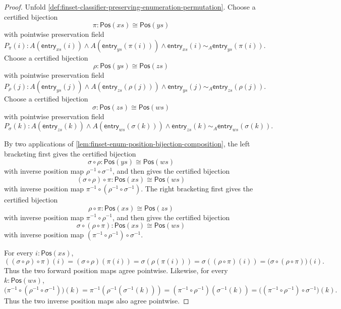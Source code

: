 \begin{proof}
Unfold \autoref{def:finset-classifier-preserving-enumeration-permutation}. Choose a certified bijection
$$
\pi:\mathsf{Pos}(xs)\cong\mathsf{Pos}(ys)
$$
with pointwise preservation field
$$
P_\pi(i):
A(\mathsf{entry}_{xs}(i))\land
A(\mathsf{entry}_{ys}(\pi(i)))\land
\mathsf{entry}_{xs}(i)\sim_A\mathsf{entry}_{ys}(\pi(i)).
$$
Choose a certified bijection
$$
\rho:\mathsf{Pos}(ys)\cong\mathsf{Pos}(zs)
$$
with pointwise preservation field
$$
P_\rho(j):
A(\mathsf{entry}_{ys}(j))\land
A(\mathsf{entry}_{zs}(\rho(j)))\land
\mathsf{entry}_{ys}(j)\sim_A\mathsf{entry}_{zs}(\rho(j)).
$$
Choose a certified bijection
$$
\sigma:\mathsf{Pos}(zs)\cong\mathsf{Pos}(ws)
$$
with pointwise preservation field
$$
P_\sigma(k):
A(\mathsf{entry}_{zs}(k))\land
A(\mathsf{entry}_{ws}(\sigma(k)))\land
\mathsf{entry}_{zs}(k)\sim_A\mathsf{entry}_{ws}(\sigma(k)).
$$

By two applications of \autoref{lem:finset-enum-position-bijection-composition}, the left bracketing first gives the certified bijection
$$
\sigma\circ\rho:\mathsf{Pos}(ys)\cong\mathsf{Pos}(ws)
$$
with inverse position map $\rho^{-1}\circ\sigma^{-1}$, and then gives the certified bijection
$$
(\sigma\circ\rho)\circ\pi:\mathsf{Pos}(xs)\cong\mathsf{Pos}(ws)
$$
with inverse position map $\pi^{-1}\circ(\rho^{-1}\circ\sigma^{-1})$. The right bracketing first gives the certified bijection
$$
\rho\circ\pi:\mathsf{Pos}(xs)\cong\mathsf{Pos}(zs)
$$
with inverse position map $\pi^{-1}\circ\rho^{-1}$, and then gives the certified bijection
$$
\sigma\circ(\rho\circ\pi):\mathsf{Pos}(xs)\cong\mathsf{Pos}(ws)
$$
with inverse position map $(\pi^{-1}\circ\rho^{-1})\circ\sigma^{-1}$.

For every $i:\mathsf{Pos}(xs)$,
$$
((\sigma\circ\rho)\circ\pi)(i)
=(\sigma\circ\rho)(\pi(i))
=\sigma(\rho(\pi(i)))
=\sigma((\rho\circ\pi)(i))
=\bigl(\sigma\circ(\rho\circ\pi)\bigr)(i).
$$
Thus the two forward position maps agree pointwise. Likewise, for every $k:\mathsf{Pos}(ws)$,
$$
\bigl(\pi^{-1}\circ(\rho^{-1}\circ\sigma^{-1})\bigr)(k)
=\pi^{-1}(\rho^{-1}(\sigma^{-1}(k)))
=(\pi^{-1}\circ\rho^{-1})(\sigma^{-1}(k))
=\bigl((\pi^{-1}\circ\rho^{-1})\circ\sigma^{-1}\bigr)(k).
$$
Thus the two inverse position maps also agree pointwise.


\end{proof}
